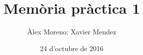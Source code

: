 \documentclass[catalan,parskip=half*,oneside,hidelinks]{scrreprt}
\begin{document}
\title{Memòria pràctica 1}
\date{24 d'octubre de 2016}
\author{Àlex Moreno; Xavier Mendez}

\maketitle

\tableofcontents
\clearpage



\end{document}

